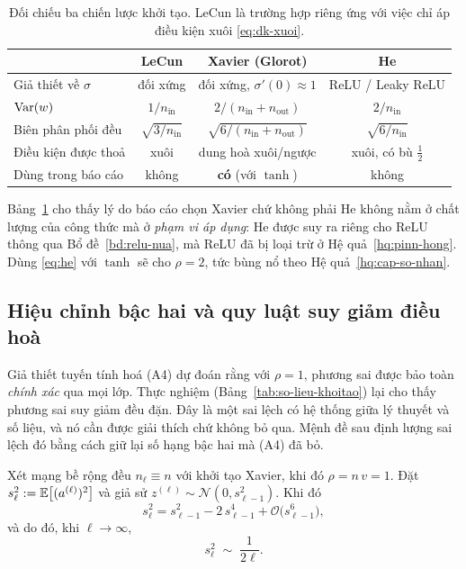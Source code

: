 \begin{table}[H]
\centering
\caption{Đối chiếu ba chiến lược khởi tạo. LeCun là trường hợp riêng ứng với
việc chỉ áp điều kiện xuôi \eqref{eq:dk-xuoi}.}
\label{tab:khoitao}
\small
\begin{tabular}{@{}l c c c@{}}
\toprule
& \textbf{LeCun} & \textbf{Xavier (Glorot)} & \textbf{He} \\
\midrule
Giả thiết về $\sigma$ & đối xứng & đối xứng, $\sigma'(0)\approx1$
  & ReLU / Leaky ReLU \\
$\operatorname{Var}(w)$ & $1/n_{\text{in}}$ & $2/(n_{\text{in}}+n_{\text{out}})$
  & $2/n_{\text{in}}$ \\
Biên phân phối đều & $\sqrt{3/n_{\text{in}}}$
  & $\sqrt{6/(n_{\text{in}}+n_{\text{out}})}$ & $\sqrt{6/n_{\text{in}}}$ \\
Điều kiện được thoả & xuôi & dung hoà xuôi/ngược & xuôi, có bù $\tfrac12$ \\
Dùng trong báo cáo & không & \textbf{có} (với $\tanh$) & không \\
\bottomrule
\end{tabular}
\end{table}
 
Bảng~\ref{tab:khoitao} cho thấy lý do báo cáo chọn Xavier chứ không phải He
không nằm ở chất lượng của công thức mà ở \emph{phạm vi áp dụng}: He được suy ra
riêng cho ReLU thông qua Bổ đề~\ref{bd:relu-nua}, mà ReLU đã bị loại trừ ở
Hệ quả~\ref{hq:pinn-hong}. Dùng \eqref{eq:he} với $\tanh$ sẽ cho $\rho = 2$, tức
bùng nổ theo Hệ quả~\ref{hq:cap-so-nhan}.
 
\subsection{Hiệu chỉnh bậc hai và quy luật suy giảm điều hoà}
\label{subsec:hieu-chinh}
 
Giả thiết tuyến tính hoá (A4) dự đoán rằng với $\rho = 1$, phương sai được bảo
toàn \emph{chính xác} qua mọi lớp. Thực nghiệm (Bảng~\ref{tab:so-lieu-khoitao})
lại cho thấy phương sai suy giảm đều đặn. Đây là một sai lệch có hệ thống giữa
lý thuyết và số liệu, và nó cần được giải thích chứ không bỏ qua. Mệnh đề sau
định lượng sai lệch đó bằng cách giữ lại số hạng bậc hai mà (A4) đã bỏ.
 
\begin{menhde}
\label{md:hieu-chinh}
Xét mạng bề rộng đều $n_\ell \equiv n$ với khởi tạo Xavier, khi đó
$\rho = n\,v = 1$. Đặt $s_\ell^2 := \mathbb{E}\big[(a^{(\ell)})^2\big]$ và giả sử
$z^{(\ell)} \sim \mathcal{N}(0, s_{\ell-1}^2)$. Khi đó
\begin{equation}
s_\ell^2 = s_{\ell-1}^2 - 2\,s_{\ell-1}^4 + \mathcal{O}\big(s_{\ell-1}^6\big),
\label{eq:hieu-chinh}
\end{equation}
và do đó, khi $\ell \to \infty$,
\begin{equation}
s_\ell^2 \;\sim\; \frac{1}{2\ell}.
\label{eq:dieu-hoa}
\end{equation}
\end{menhde}
 
